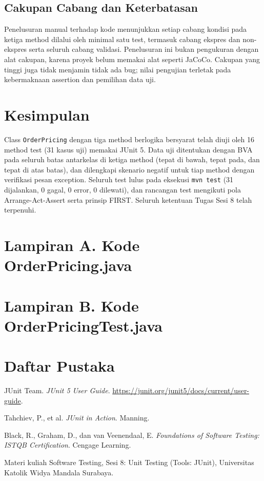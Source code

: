 \documentclass[11pt,a4paper]{article}
\begin{document}
\subsection{Cakupan Cabang dan Keterbatasan}
Penelusuran manual terhadap kode menunjukkan setiap cabang kondisi pada ketiga method dilalui oleh minimal satu test, termasuk cabang ekspres dan non-ekspres serta seluruh cabang validasi. Penelusuran ini bukan pengukuran dengan alat cakupan, karena proyek belum memakai alat seperti JaCoCo. Cakupan yang tinggi juga tidak menjamin tidak ada bug; nilai pengujian terletak pada kebermaknaan assertion dan pemilihan data uji.

\section{Kesimpulan}
Class \texttt{OrderPricing} dengan tiga method berlogika bersyarat telah diuji oleh 16 method test (31 kasus uji) memakai JUnit 5. Data uji ditentukan dengan BVA pada seluruh batas antarkelas di ketiga method (tepat di bawah, tepat pada, dan tepat di atas batas), dan dilengkapi skenario negatif untuk tiap method dengan verifikasi pesan exception. Seluruh test lulus pada eksekusi \texttt{mvn test} (31 dijalankan, 0 gagal, 0 error, 0 dilewati), dan rancangan test mengikuti pola Arrange-Act-Assert serta prinsip FIRST. Seluruh ketentuan Tugas Sesi 8 telah terpenuhi.

\clearpage
\section*{Lampiran A. Kode OrderPricing.java}


\clearpage
\section*{Lampiran B. Kode OrderPricingTest.java}


\section*{Daftar Pustaka}
\begin{enumerate}[label={[\arabic*]},leftmargin=*]
  \item JUnit Team. \textit{JUnit 5 User Guide}. \url{https://junit.org/junit5/docs/current/user-guide}.
  \item Tahchiev, P., et al. \textit{JUnit in Action}. Manning.
  \item Black, R., Graham, D., dan van Veenendaal, E. \textit{Foundations of Software Testing: ISTQB Certification}. Cengage Learning.
  \item Materi kuliah Software Testing, Sesi 8: Unit Testing (Tools: JUnit), Universitas Katolik Widya Mandala Surabaya.
\end{enumerate}
\end{document}
